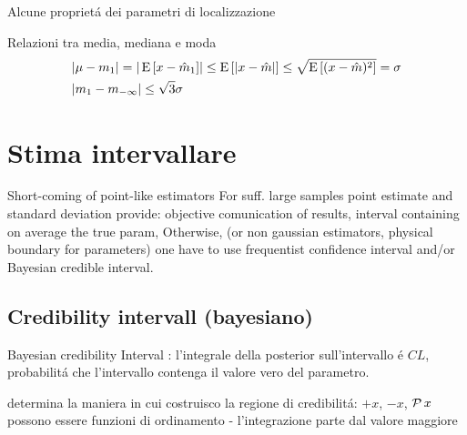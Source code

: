 \documentclass[asd-beamer.tex]{subfiles}
\begin{document}
\begin{wordonframe}{Alcune propriet\'a dei parametri di localizzazione}
\begin{block}{Relazioni tra media, mediana e moda}
\begin{align*}
&|\mu-m_1|=|\operatorname{E}{[x-\hat{m}_1]}|\leq\operatorname{E}{[|x-\hat{m}|]}\leq\sqrt{\operatorname{E}{[(x-\hat{m})^2]}}=\sigma\\
&|m_1-m_{-\infty}|\leq\sqrt{3}\sigma
\end{align*}
\end{block}
\end{wordonframe}

\section{Stima intervallare}

\begin{frame}{Short-coming of point-like estimators}
For suff. large samples  point estimate and standard deviation provide: objective comunication of results, interval containing on average the true param, 
Otherwise, (or non gaussian estimators, physical boundary for parameters) one have to use frequentist confidence interval and/or Bayesian credible interval.
\end{frame}

\subsection{Credibility intervall (bayesiano)}

\begin{frame}[fragile]{Bayesian credibility Interval}
: l'integrale della posterior sull'intervallo \'e $CL$, probabilit\'a che l'intervallo contenga il valore vero del parametro.
\begin{block}{}
	determina la maniera in cui costruisco la regione di credibilit\'a: $+x$, $-x$, $\operatorname{\mathcal{P}}{x}$ possono essere funzioni di ordinamento - l'integrazione parte dal valore maggiore
\end{block}
\end{frame}
\end{document}

